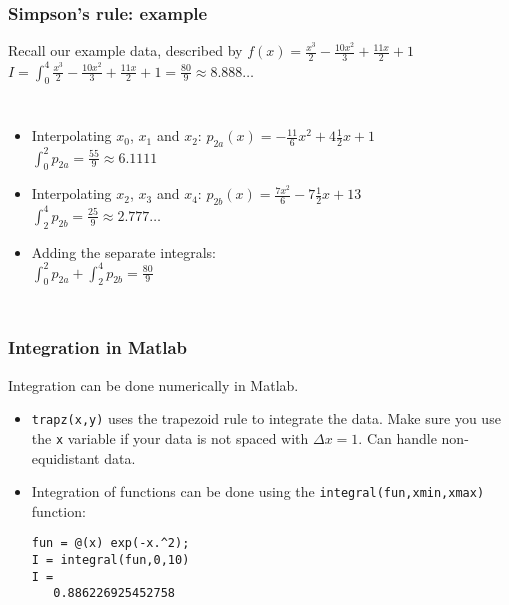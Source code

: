 \documentclass[11pt,table,final,fleqn,xcolor={usenames,dvipsnames,table},handout]{beamer}
\begin{document}
\begin{frame}
  \frametitle{Simpson's rule: example}
  \footnotesize\selectfont
  Recall our example data, described by $f(x)=\frac{x^3}{2}-\frac{10x^2}{3}+\frac{11x}{2}+1$ \\
  $ I = \int_0^4 \frac{x^3}{2}-\frac{10x^2}{3}+\frac{11x}{2}+1 = \frac{80}{9} \approx 8.888\ldots$
  \begin{columns}
    \begin{itemize}
      \item<2-> \color{tuered}Interpolating $x_0$, $x_1$ and $x_2$:  $ p_{2a}(x) = -\frac{11}{6}x^2+4\frac{1}{2}x+1 $ \\
      $\int_0^2 p_{2a} = \frac{55}{9} \approx 6.1111$
      \item<3-> \color{tuelblue} Interpolating $x_2$, $x_3$ and $x_4$: $ p_{2b}(x) = \frac{7x^2}{6}-7\frac{1}{2}x+13 $ \\
      $\int_2^4 p_{2b} = \frac{25}{9} \approx 2.777\ldots$
      \item<4-> Adding the separate integrals: \\
      $\int_0^2 p_{2a} + \int_2^4 p_{2b} = \frac{80}{9}$
    \end{itemize}
    \centering
  \end{columns}
\end{frame}

\begin{frame}[fragile]
  \frametitle{Integration in Matlab}
  Integration can be done numerically in Matlab.
  \begin{itemize}
    \item \lstinline$trapz(x,y)$ uses the trapezoid rule to integrate the data. Make sure you use the \lstinline$x$ variable if your data is not spaced with $\Delta x=1$. Can handle non-equidistant data.
    \item Integration of functions can be done using the \lstinline$integral(fun,xmin,xmax)$ function:
    \begin{lstlisting}
fun = @(x) exp(-x.^2);
I = integral(fun,0,10)
I =
   0.886226925452758
    \end{lstlisting}
  \end{itemize}
\end{frame}
\end{document}
